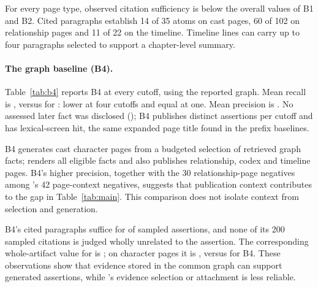 For every \sys page type, observed citation sufficiency is below the overall values of
B1 and B2. Cited paragraphs establish 14 of 35 atoms on cast pages, 60 of 102 on
relationship pages and 11 of 22 on the timeline. Timeline lines can carry up to four
paragraphs selected to support a chapter-level summary.


\paragraph{The graph baseline (B4).}
Table~\ref{tab:b4} reports B4 at every cutoff, using the reported \sys graph.
Mean recall is , versus  for \sys:
lower at four cutoffs and equal at one. Mean precision is .
No assessed later fact was disclosed (); B4 publishes
 distinct assertions per cutoff and has 
lexical-screen hit, the same expanded page title found in the prefix baselines.

B4 generates cast character pages from a budgeted selection of retrieved graph facts;
\sys renders all eligible facts and also publishes relationship, codex and timeline
pages. B4's higher precision, together with the 30 relationship-page negatives among
\sys's 42 page-context negatives, suggests that publication context contributes to
the gap in Table~\ref{tab:main}. This comparison does not isolate context from selection
and generation.

B4's cited paragraphs suffice for  of sampled assertions, and none
of its 200 sampled citations is judged wholly unrelated to the assertion.
The corresponding whole-artifact value for \sys is ;
on character pages it is , versus  for B4.
These observations show that evidence stored in the common graph can support generated
assertions, while \sys's evidence selection or attachment is less reliable.

